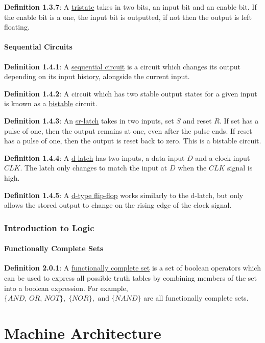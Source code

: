 \documentclass{article}
\newcommand{\separate}[1] {\vspace{#1 pt}\noindent}
\newcommand{\definition}[2]{\textbf{Definition #1}: #2\label{def:#1}}
\begin{document}
\separate{7}\definition{1.3.7}{A \underline{tristate} takes in two bits, an input bit and an enable bit. If the enable bit is a one, the input bit is outputted, if not then the output is left floating.}

\subsection{Sequential Circuits}

\definition{1.4.1}{A \underline{sequential circuit} is a circuit which changes its output depending on its input history, alongside the current input.}

\separate{7}\definition{1.4.2}{A circuit which has two stable output states for a given input is known as a \underline{bistable} circuit.}

\separate{7}\definition{1.4.3}{An \underline{sr-latch} takes in two inputs, set \(S\) and reset \(R\). If set has a pulse of one, then the output remains at one, even after the pulse ends. If reset has a pulse of one, then the output is reset back to zero. This is a bistable circuit.}

\separate{7}\definition{1.4.4}{A \underline{d-latch} has two inputs, a data input \(D\) and a clock input \(CLK\). The latch only changes to match the input at \(D\) when the \(CLK\) signal is high.}

\separate{7}\definition{1.4.5}{A \underline{d-type flip-flop} works similarly to the d-latch, but only allows the stored output to change on the rising edge of the clock signal.}

\section{Introduction to Logic}

\subsection{Functionally Complete Sets}

\definition{2.0.1}{A \underline{functionally complete set} is a set of boolean operators which can be used to express all possible truth tables by combining members of the set into a boolean expression. For example,
\(\{AND,\,OR,\,NOT\},\;\{NOR\},\text{ and}\;\{NAND\}\) are all functionally complete sets.}

\newpage\part{Machine Architecture}\label{part:2.ma}
\end{document}
